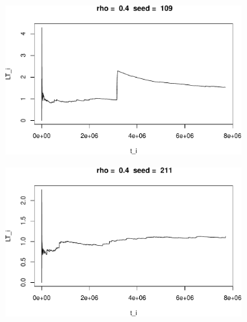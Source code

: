 \documentclass[]{article}
\begin{document}
\begin{figure}[h!]
\begin{subfigure}[b]{.55\linewidth}

\includegraphics[width=\linewidth]{003_files/figure-latex/unnamed-chunk-13-3.pdf}
\end{subfigure}\hfill
\begin{subfigure}[b]{.55\linewidth}
\includegraphics[width=\linewidth]{003_files/figure-latex/unnamed-chunk-13-4.pdf}
\end{subfigure}\vfill
\end{figure}
\end{document}
